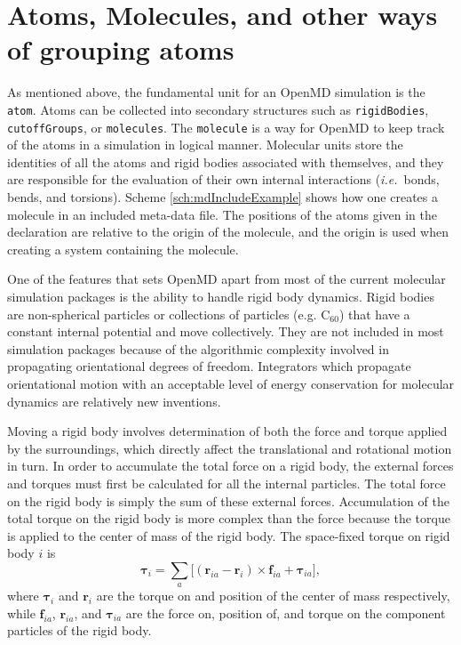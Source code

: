 \documentclass[]{book}
\begin{document}
\section{\label{section:atomsMolecules}Atoms, Molecules, and other
ways of grouping atoms}

As mentioned above, the fundamental unit for an {\sc OpenMD} simulation
is the {\tt atom}.  Atoms can be collected into secondary structures
such as {\tt rigidBodies}, {\tt cutoffGroups}, or {\tt molecules}. The
{\tt molecule} is a way for {\sc OpenMD} to keep track of the atoms in
a simulation in logical manner. Molecular units store the identities
of all the atoms and rigid bodies associated with themselves, and they
are responsible for the evaluation of their own internal interactions
(\emph{i.e.}~bonds, bends, and torsions). Scheme
\ref{sch:mdIncludeExample} shows how one creates a molecule in an
included meta-data file. The positions of the atoms given in the
declaration are relative to the origin of the molecule, and the origin
is used when creating a system containing the molecule.

One of the features that sets {\sc OpenMD} apart from most of the
current molecular simulation packages is the ability to handle rigid
body dynamics. Rigid bodies are non-spherical particles or collections
of particles (e.g. $\mbox{C}_{60}$) that have a constant internal
potential and move collectively.\cite{Goldstein01} They are not
included in most simulation packages because of the algorithmic
complexity involved in propagating orientational degrees of freedom.
Integrators which propagate orientational motion with an acceptable
level of energy conservation for molecular dynamics are relatively
new inventions.  

Moving a rigid body involves determination of both the force and
torque applied by the surroundings, which directly affect the
translational and rotational motion in turn. In order to accumulate
the total force on a rigid body, the external forces and torques must
first be calculated for all the internal particles. The total force on
the rigid body is simply the sum of these external forces.
Accumulation of the total torque on the rigid body is more complex
than the force because the torque is applied to the center of mass of
the rigid body. The space-fixed torque on rigid body $i$ is
\begin{equation}
\boldsymbol{\tau}_i=
	\sum_{a}\biggl[(\mathbf{r}_{ia}-\mathbf{r}_i)\times \mathbf{f}_{ia} 
	+ \boldsymbol{\tau}_{ia}\biggr],
\label{eq:torqueAccumulate}
\end{equation}
where $\boldsymbol{\tau}_i$ and $\mathbf{r}_i$ are the torque on and
position of the center of mass respectively, while $\mathbf{f}_{ia}$,
$\mathbf{r}_{ia}$, and $\boldsymbol{\tau}_{ia}$ are the force on,
position of, and torque on the component particles of the rigid body.
\end{document}
